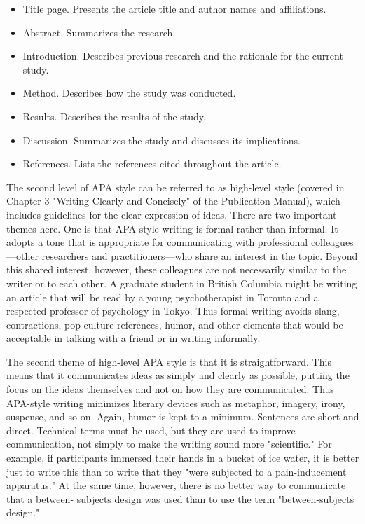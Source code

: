 \begin{itemize}
\item Title page. Presents the article title and author names and affiliations.

\item Abstract. Summarizes the research.

\item Introduction. Describes previous research and the rationale for the current study.

\item Method. Describes how the study was conducted.

\item Results. Describes the results of the study.

\item Discussion. Summarizes the study and discusses its implications.

\item References. Lists the references cited throughout the article.

\end{itemize}

The second level of APA style can be referred to as high-level style (covered in Chapter 3 "Writing Clearly and Concisely" of the Publication Manual), which includes guidelines for the clear expression of ideas. There are two important themes here. One is that APA-style writing is formal rather than informal. It adopts a tone that is appropriate for communicating with professional colleagues---other researchers and practitioners---who share an interest in the topic. Beyond this shared interest, however, these colleagues are not necessarily similar to the writer or to each other. A graduate student in British Columbia might be writing an article that will be read by a young psychotherapist in Toronto and a respected professor of psychology in Tokyo. Thus formal writing avoids slang, contractions, pop culture references, humor, and other elements that would be acceptable in talking with a friend or in writing informally.


The second theme of high-level APA style is that it is straightforward. This means that it communicates ideas as simply and clearly as possible, putting the focus on the ideas themselves and not on how they are communicated. Thus APA-style writing minimizes literary devices such as metaphor, imagery, irony, suspense, and so on. Again, humor is kept to a minimum. Sentences are short and direct. Technical terms must be used, but they are used to improve communication, not simply to make the writing sound more "scientific." For example, if participants immersed their hands in a bucket of ice water, it is better just to write this than to write that they "were subjected to a pain-inducement apparatus." At the same time, however, there is no better way to communicate that a between- subjects design was used than to use the term "between-subjects design."


